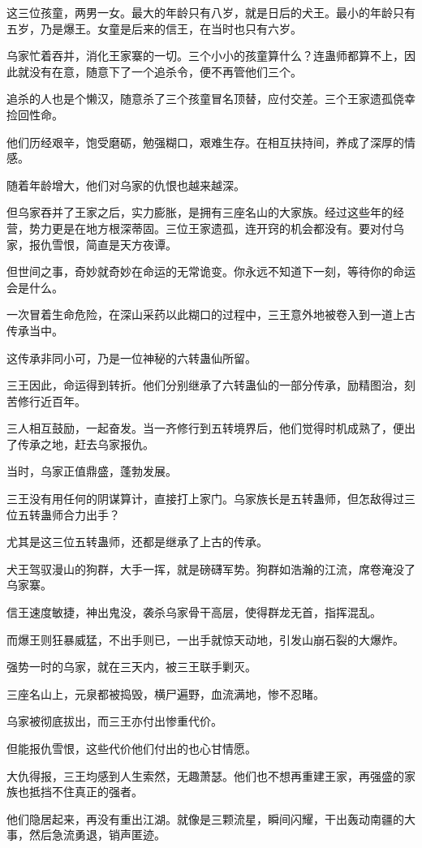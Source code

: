 \begin{this_body}
这三位孩童，两男一女。最大的年龄只有八岁，就是日后的犬王。最小的年龄只有五岁，乃是爆王。女童是后来的信王，在当时也只有六岁。

乌家忙着吞并，消化王家寨的一切。三个小小的孩童算什么？连蛊师都算不上，因此就没有在意，随意下了一个追杀令，便不再管他们三个。

追杀的人也是个懒汉，随意杀了三个孩童冒名顶替，应付交差。三个王家遗孤侥幸捡回性命。

他们历经艰辛，饱受磨砺，勉强糊口，艰难生存。在相互扶持间，养成了深厚的情感。

随着年龄增大，他们对乌家的仇恨也越来越深。

但乌家吞并了王家之后，实力膨胀，是拥有三座名山的大家族。经过这些年的经营，势力更是在地方根深蒂固。三位王家遗孤，连开窍的机会都没有。要对付乌家，报仇雪恨，简直是天方夜谭。

但世间之事，奇妙就奇妙在命运的无常诡变。你永远不知道下一刻，等待你的命运会是什么。

一次冒着生命危险，在深山采药以此糊口的过程中，三王意外地被卷入到一道上古传承当中。

这传承非同小可，乃是一位神秘的六转蛊仙所留。

三王因此，命运得到转折。他们分别继承了六转蛊仙的一部分传承，励精图治，刻苦修行近百年。

三人相互鼓励，一起奋发。当一齐修行到五转境界后，他们觉得时机成熟了，便出了传承之地，赶去乌家报仇。

当时，乌家正值鼎盛，蓬勃发展。

三王没有用任何的阴谋算计，直接打上家门。乌家族长是五转蛊师，但怎敌得过三位五转蛊师合力出手？

尤其是这三位五转蛊师，还都是继承了上古的传承。

犬王驾驭漫山的狗群，大手一挥，就是磅礴军势。狗群如浩瀚的江流，席卷淹没了乌家寨。

信王速度敏捷，神出鬼没，袭杀乌家骨干高层，使得群龙无首，指挥混乱。

而爆王则狂暴威猛，不出手则已，一出手就惊天动地，引发山崩石裂的大爆炸。

强势一时的乌家，就在三天内，被三王联手剿灭。

三座名山上，元泉都被捣毁，横尸遍野，血流满地，惨不忍睹。

乌家被彻底拔出，而三王亦付出惨重代价。

但能报仇雪恨，这些代价他们付出的也心甘情愿。

大仇得报，三王均感到人生索然，无趣萧瑟。他们也不想再重建王家，再强盛的家族也抵挡不住真正的强者。

他们隐居起来，再没有重出江湖。就像是三颗流星，瞬间闪耀，干出轰动南疆的大事，然后急流勇退，销声匿迹。


\end{this_body}
